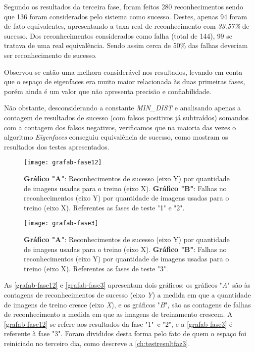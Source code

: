 Segundo os resultados da terceira fase, foram feitos 280 reconhecimentos sendo que 136 foram considerados pelo sistema como sucesso. Destes, apenas 94 foram de fato equivalentes, apresentando a taxa real de reconhecimento com \textit{33.57\%} de sucesso. Dos reconhecimentos considerados como falha (total de 144), 99 se tratava de uma real equivalência. Sendo assim cerca de 50\% das falhas deveriam ser reconhecimento de sucesso.

Observou-se então uma melhora considerável nos resultados, levando em conta que o espaço de eigenfaces era muito maior relacionada às duas primeiras fases, porém ainda é um valor que não apresenta precisão e confiabilidade. 

Não obstante, desconsiderando a constante \textit{MIN\_DIST} e analisando apenas a contagem de resultados de sucesso (com falsos positivos já subtraídos) somandos com a contagem dos falsos negativos, verificamos que na maioria das vezes o algoritmo \textit{Eigenfaces} conseguiu equivalência de sucesso, como mostram os resultados dos testes apresentados.


\begin{figure}[h]
	\centering
	\texttt{[image: grafab-fase12]}
	\caption{\textbf{Gráfico "A"}: Reconhecimentos de sucesso (eixo Y) por quantidade de imagens usadas para o treino (eixo X). \textbf{Gráfico "B"}: Falhas no reconhecimentos (eixo Y) por quantidade de imagens usadas para o treino (eixo X). Referentes as fases de teste "1" e "2".}
	\label{grafab-fase12}
\end{figure}

\begin{figure}[h]
	\centering
	\texttt{[image: grafab-fase3]}
	\caption{\textbf{Gráfico "A"}: Reconhecimentos de sucesso (eixo Y) por quantidade de imagens usadas para o treino (eixo X). \textbf{Gráfico "B"}: Falhas no reconhecimentos (eixo Y) por quantidade de imagens usadas para o treino (eixo X). Referentes as fases de teste "3".}
	\label{grafab-fase3}
\end{figure}


As \autoref{grafab-fase12} e \autoref{grafab-fase3} apresentam dois gráficos: os gráficos "\textit{A}" são às contagens de reconhecimentos de sucesso (eixo \textit{Y}) a medida em que a quantidade de imagens de treino cresce (eixo \textit{X}), e os gráficos "\textit{B}", são as contagens de falhas de reconhecimento a medida em que as imagens de treinamento crescem. A \autoref{grafab-fase12} se refere aos resultados da fase "1"\ e "2", e a \autoref{grafab-fase3} é referente à fase "3". Foram divididos desta forma pelo fato de quem o espaço foi reiniciado no terceiro dia, como descreve a \autoref{ch:testresultfaz3}. 

